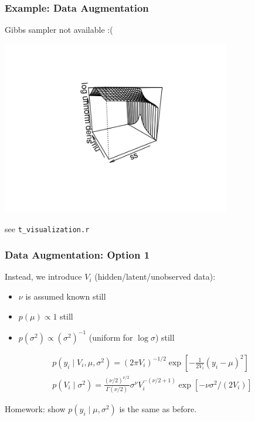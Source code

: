 \documentclass{beamer}
\begin{document}
\begin{frame}[fragile]
\frametitle{Example: Data Augmentation}

Gibbs sampler not available :( 

\begin{center}
\includegraphics[width=100mm]{surf1}
\end{center}
see \verb|t_visualization.r|

\end{frame}


\begin{frame}
\frametitle{Data Augmentation: Option 1}

Instead, we introduce $V_i$ (hidden/latent/unobserved data):
\begin{itemize}
\item $\nu$ is assumed known still
\item $p(\mu) \propto 1$ still
\item $p(\sigma^2) \propto (\sigma^2)^{-1}$ (uniform for $\log \sigma$) still
\end{itemize}

\begin{gather}
p(y_i \mid V_i, \mu, \sigma^2) = (2\pi V_i)^{-1/2} \exp\left[- \frac{1}{2 V_i}\left(y_i - \mu \right)^2 \right] \\
p( V_i \mid \sigma^2) = \frac{(\nu/2)^{\nu/2}}{\Gamma(\nu/2) }\sigma^{\nu} V_i^{-(\nu/2 + 1)}\exp\left[- \nu \sigma^2/(2 V_i) \right]
\end{gather}


Homework: show $p(y_i \mid \mu, \sigma^2)$ is the same as before.
\end{frame}
\end{document}
